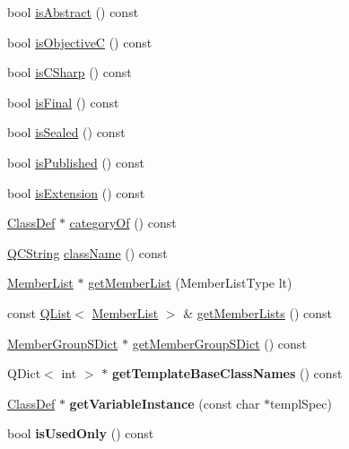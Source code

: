 \begin{DoxyCompactItemize}
\item 
bool \hyperlink{class_class_def_ac7f749737f31e5dc070351bbe5214793}{is\-Abstract} () const 
\item 
bool \hyperlink{class_class_def_ab5793e9c44df25523354dc0d0210e54f}{is\-Objective\-C} () const 
\item 
bool \hyperlink{class_class_def_a06620e645a54d46fb481d2ea594f59cf}{is\-C\-Sharp} () const 
\item 
bool \hyperlink{class_class_def_aa1c038a9fa70a19d46c1ea65cbffdb2d}{is\-Final} () const 
\item 
bool \hyperlink{class_class_def_a27367a1b9326358f119463c48350f887}{is\-Sealed} () const 
\item 
bool \hyperlink{class_class_def_a3d09e3bb6fc4144c31a80fd26d401e69}{is\-Published} () const 
\item 
bool \hyperlink{class_class_def_a9ef3fb490d8218394f1091152c631575}{is\-Extension} () const 
\item 
\hyperlink{class_class_def}{Class\-Def} $\ast$ \hyperlink{class_class_def_af897ec96b5a2136f22986353269c091a}{category\-Of} () const 
\item 
\hyperlink{class_q_c_string}{Q\-C\-String} \hyperlink{class_class_def_af0a121aefc7a4a8d9fdda94b6d845ca1}{class\-Name} () const 
\item 
\hyperlink{class_member_list}{Member\-List} $\ast$ \hyperlink{class_class_def_af9947305eeabd8e482637af1ccb4ec4e}{get\-Member\-List} (Member\-List\-Type lt)
\item 
const \hyperlink{class_q_list}{Q\-List}$<$ \hyperlink{class_member_list}{Member\-List} $>$ \& \hyperlink{class_class_def_a958ea00543faccec752fba58fcf79d43}{get\-Member\-Lists} () const 
\item 
\hyperlink{class_member_group_s_dict}{Member\-Group\-S\-Dict} $\ast$ \hyperlink{class_class_def_aebe674b96b5f7f7433f7d161e5a2f047}{get\-Member\-Group\-S\-Dict} () const 
\item 
\hypertarget{class_class_def_a61227c47a6723ba7a5940edf958606f8}{Q\-Dict$<$ int $>$ $\ast$ {\bfseries get\-Template\-Base\-Class\-Names} () const }\label{class_class_def_a61227c47a6723ba7a5940edf958606f8}

\item 
\hypertarget{class_class_def_af6ff262fde60dda76af627de607838a0}{\hyperlink{class_class_def}{Class\-Def} $\ast$ {\bfseries get\-Variable\-Instance} (const char $\ast$templ\-Spec)}\label{class_class_def_af6ff262fde60dda76af627de607838a0}

\item 
\hypertarget{class_class_def_acd998e677fa172f364757bc7c0faa82d}{bool {\bfseries is\-Used\-Only} () const }\label{class_class_def_acd998e677fa172f364757bc7c0faa82d}


\end{DoxyCompactItemize}
